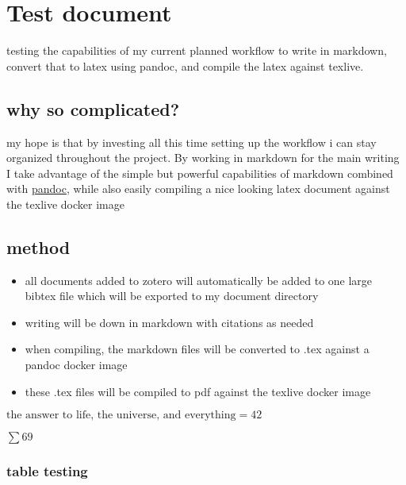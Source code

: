 \hypertarget{test-document}{%
\section{Test document}\label{test-document}}

testing the capabilities of my current planned workflow to write in
markdown, convert that to latex using pandoc, and compile the latex
against texlive.

\hypertarget{why-so-complicated}{%
\subsection{why so complicated?}\label{why-so-complicated}}

my hope is that by investing all this time setting up the workflow i can
stay organized throughout the project. By working in markdown for the
main writing I take advantage of the simple but powerful capabilities of
markdown combined with \href{https://pandoc.org/}{pandoc}, while also
easily compiling a nice looking latex document against the texlive
docker image

\hypertarget{method}{%
\subsection{method}\label{method}}

\begin{itemize}
\tightlist
\item
  all documents added to zotero will automatically be added to one large
  bibtex file which will be exported to my document directory
\item
  writing will be down in markdown with citations as needed
\item
  when compiling, the markdown files will be converted to .tex against a
  pandoc docker image
\item
  these .tex files will be compiled to pdf against the texlive docker
  image \autocite{PandocPandoc}
\end{itemize}

\(\text{the answer to life, the universe, and everything} = 42\)

\(\sum{69}\)

\hypertarget{table-testing}{%
\subsubsection{table testing}\label{table-testing}}

